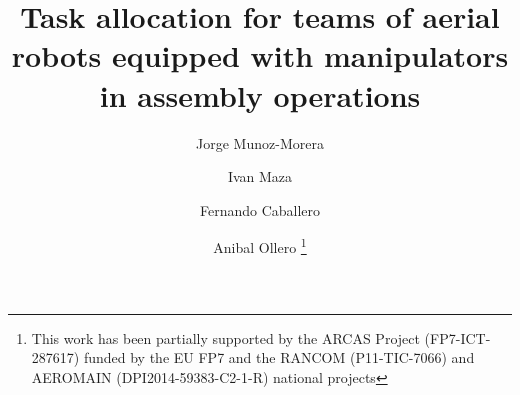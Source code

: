 \documentclass[runningheads,a4paper]{llncs}
\begin{document}
\mainmatter  %

\graphicspath{{./}{./figures/}}

\title{Task allocation for teams of aerial robots equipped with manipulators in assembly operations}



%
%
\author{Jorge Munoz-Morera%
\and Ivan Maza\and Fernando Caballero\and Anibal Ollero
\thanks{This work has been partially supported by the ARCAS Project (FP7-ICT-287617) funded by the EU FP7 and the RANCOM (P11-TIC-7066) and AEROMAIN (DPI2014-59383-C2-1-R) national projects} %
}
%


%
%

\maketitle
\end{document}
